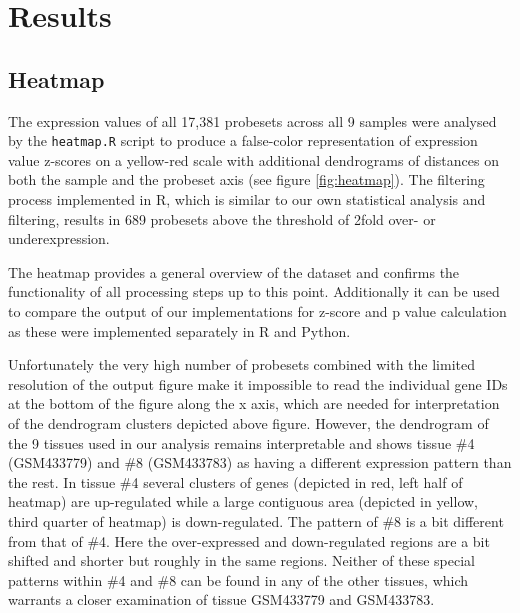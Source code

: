 \section{Results}

\subsection{Heatmap}

The expression values of all 17,381 probesets across all 9 samples were analysed
by the \lstinline|heatmap.R| script to produce a false-color representation of
expression value z-scores on a yellow-red scale with additional dendrograms of
distances on both the sample and the probeset axis (see figure
\ref{fig:heatmap}). The filtering process implemented in R, which is similar to
our own statistical analysis and filtering, results in 689 probesets above the
threshold of 2fold over- or underexpression.

The heatmap provides a general overview of the dataset and confirms the
functionality of all processing steps up to this point. Additionally it can be
used to compare the output of our implementations for z-score and p value
calculation as these were implemented separately in R and Python.

Unfortunately the very high number of probesets combined with the limited
resolution of the output figure make it impossible to read the individual gene
IDs at the bottom of the figure along the x axis, which are needed for
interpretation of the dendrogram clusters depicted above figure. However, the
dendrogram of the 9 tissues used in our analysis remains interpretable and shows
tissue \#4 (GSM433779) and \#8 (GSM433783) as having a different expression
pattern than the rest. In tissue \#4 several clusters of genes (depicted in red,
left half of heatmap) are up-regulated while a large contiguous area (depicted
in yellow, third quarter of heatmap) is down-regulated. The pattern of \#8 is a
bit different from that of \#4. Here the over-expressed and down-regulated
regions are a bit shifted and shorter but roughly in the same regions. Neither
of these special patterns within \#4 and \#8 can be found in any of the other
tissues, which warrants a closer examination of tissue GSM433779 and GSM433783.


